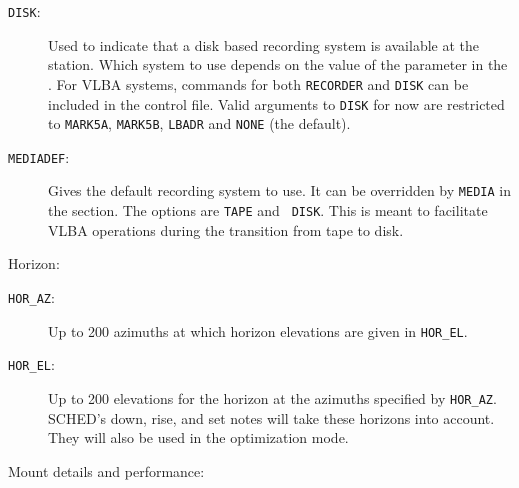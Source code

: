 \documentclass{report}
\newcommand{\sched}{{\sc SCHED}}
\begin{document}
\begin{description}
\item [{\tt DISK}:] Used to indicate that a disk based recording system
is available at the station.  Which system to use depends on the value
of the  parameter in the
.  For VLBA
systems, commands for both {\tt RECORDER} and {\tt DISK} can be
included in the control file.  Valid arguments to {\tt DISK} for
now are restricted to {\tt MARK5A}, {\tt MARK5B}, {\tt LBADR}
and {\tt NONE} (the default).

\item [{\tt MEDIADEF}:] Gives the default recording system to use.  It
can be overridden by {\tt MEDIA} in the  section.  The options are {\tt TAPE} and {\tt
DISK}.  This is meant to facilitate VLBA operations during the
transition from tape to disk.

\end{description}

Horizon:

\begin{description}

\item [{\tt HOR\_AZ}:] Up to 200 azimuths at which horizon elevations
are given in {\tt HOR\_EL}.

\item [{\tt HOR\_EL}:] Up to 200 elevations for the horizon at the
azimuths specified by {\tt HOR\_AZ}. \sched's down, rise, and set
notes will take these horizons into account. They will also be used in
the optimization mode.

\end{description}

Mount details and performance:
\end{document}
